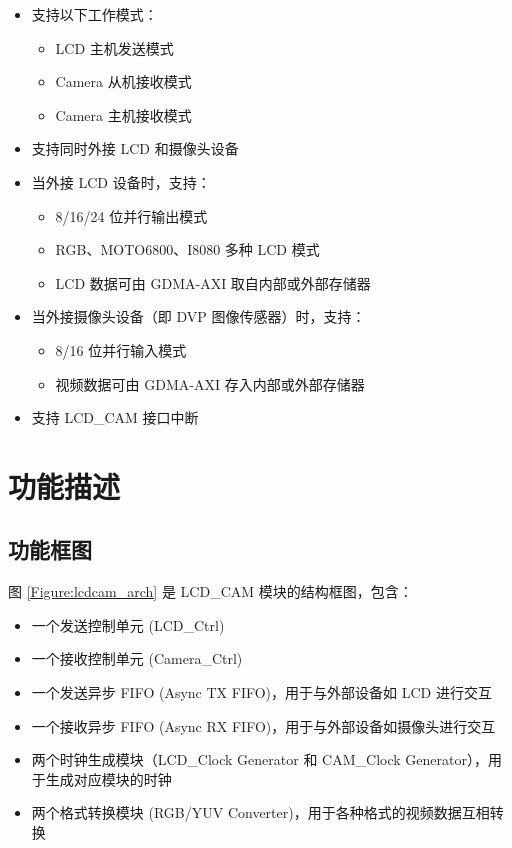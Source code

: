 \documentclass[main\_\_CN.tex]{subfiles}
\begin{document}
\begin{itemize}
    \item 支持以下工作模式：
        \begin{itemize}
        \item LCD 主机发送模式
        \item Camera 从机接收模式
        \item Camera 主机接收模式
        \end{itemize}
    \item 支持同时外接 LCD 和摄像头设备
    \item 当外接 LCD 设备时，支持：
        \begin{itemize}
        \item 8/16/24 位并行输出模式
        \item RGB、MOTO6800、I8080 多种 LCD 模式
        \item LCD 数据可由 GDMA-AXI 取自内部或外部存储器
        \end{itemize}
    \item 当外接摄像头设备（即 DVP 图像传感器）时，支持：
        \begin{itemize}
        \item 8/16 位并行输入模式
        \item 视频数据可由 GDMA-AXI 存入内部或外部存储器
        \end{itemize}
    \item 支持 LCD\_CAM 接口中断
\end{itemize}

\section{功能描述}

\subsection{功能框图}
图 \ref{Figure:lcdcam_arch} 是 \chipname{} LCD\_CAM 模块的结构框图，包含：
\begin{itemize}
    \item 一个发送控制单元 (LCD\_Ctrl)
    \item 一个接收控制单元 (Camera\_Ctrl)
    \item 一个发送异步 FIFO (Async TX FIFO)，用于与外部设备如 LCD 进行交互
    \item 一个接收异步 FIFO (Async RX FIFO)，用于与外部设备如摄像头进行交互
    \item 两个时钟生成模块（LCD\_Clock Generator 和 CAM\_Clock Generator），用于生成对应模块的时钟
    \item 两个格式转换模块 (RGB/YUV Converter)，用于各种格式的视频数据互相转换
\end{itemize}
\end{document}
